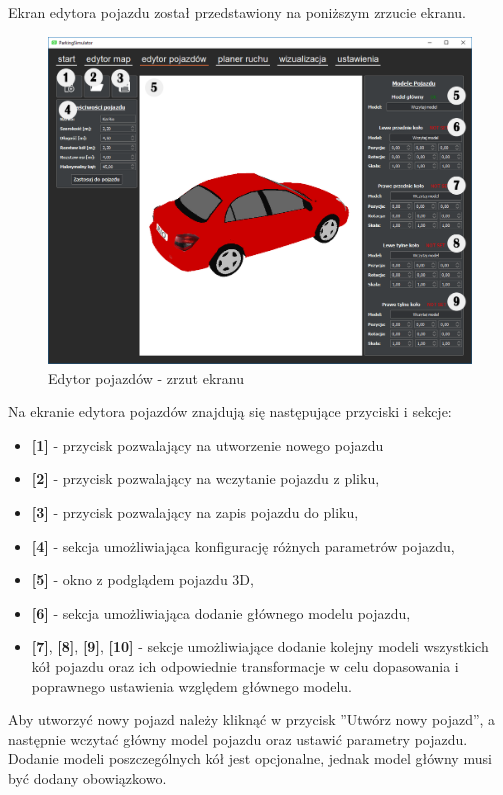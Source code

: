 \documentclass[a4paper,11pt,twoside]{report}
\theoremstyle{definition}
\begin{document}
Ekran edytora pojazdu został przedstawiony na poniższym zrzucie ekranu.

\begin{figure}[h!]
\centering
\includegraphics[scale=0.5]{instructionVehicleEditor}
\caption[Edytor pojazdów - zrzut ekranu]{Edytor pojazdów - zrzut ekranu}
\end{figure}

Na ekranie edytora pojazdów znajdują się następujące przyciski i sekcje:
\begin{itemize}
	\item \textbf{[1]} - przycisk pozwalający na utworzenie nowego pojazdu
	\item \textbf{[2]} - przycisk pozwalający na wczytanie pojazdu z pliku,
	\item \textbf{[3]} - przycisk pozwalający na zapis pojazdu do pliku,
	\item \textbf{[4]} - sekcja umożliwiająca konfigurację różnych parametrów pojazdu,
	\item \textbf{[5]} - okno z podglądem pojazdu 3D,
	\item \textbf{[6]} - sekcja umożliwiająca dodanie głównego modelu pojazdu,
	\item \textbf{[7]}, \textbf{[8]}, \textbf{[9]}, \textbf{[10]} - sekcje umożliwiające dodanie kolejny modeli wszystkich kół pojazdu oraz ich odpowiednie transformacje w celu dopasowania i poprawnego ustawienia względem głównego modelu.
\end{itemize}

Aby utworzyć nowy pojazd należy kliknąć w przycisk ''Utwórz nowy pojazd'', a następnie wczytać główny model pojazdu oraz ustawić parametry pojazdu. Dodanie modeli poszczególnych kół jest opcjonalne, jednak model główny musi być dodany obowiązkowo.
\end{document}
